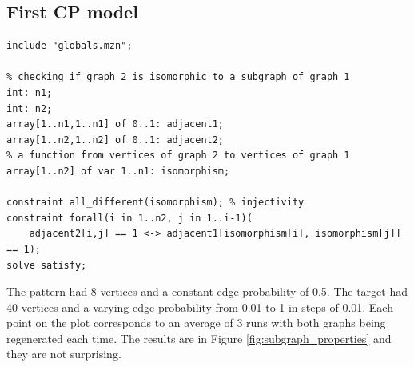 \documentclass{article}
\begin{document}
\subsection{First CP model}
\begin{lstlisting}
include "globals.mzn";

% checking if graph 2 is isomorphic to a subgraph of graph 1
int: n1;
int: n2;
array[1..n1,1..n1] of 0..1: adjacent1;
array[1..n2,1..n2] of 0..1: adjacent2;
% a function from vertices of graph 2 to vertices of graph 1
array[1..n2] of var 1..n1: isomorphism;

constraint all_different(isomorphism); % injectivity
constraint forall(i in 1..n2, j in 1..i-1)(
    adjacent2[i,j] == 1 <-> adjacent1[isomorphism[i], isomorphism[j]] == 1);
solve satisfy;
\end{lstlisting}
The pattern had 8 vertices and a constant edge probability of 0.5. The target had 40 vertices and a varying edge probability from 0.01 to 1 in steps of 0.01. Each point on the plot corresponds to an average of 3 runs with both graphs being regenerated each time. The results are in Figure \ref{fig:subgraph_properties} and they are not surprising.
\end{document}
